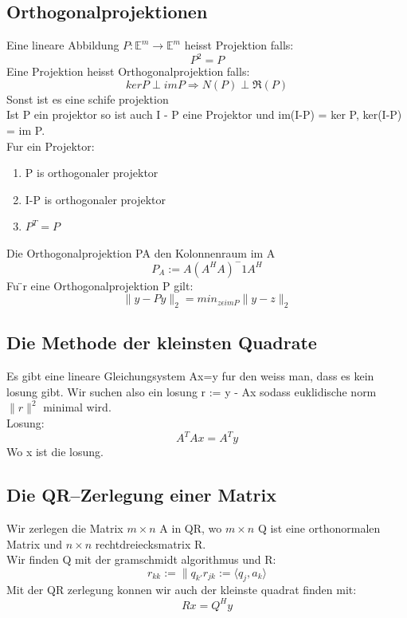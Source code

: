 \documentclass[11pt]{article}
\begin{document}
\subsection{Orthogonalprojektionen}
Eine lineare Abbildung $P: \mathbb{E}^m \rightarrow \mathbb{E}^m$ heisst Projektion falls:
\begin{equation}
	P^2=P
\end{equation}
Eine Projektion heisst Orthogonalprojektion falls:
\begin{equation}
	ker P \perp im P \Rightarrow N(P) \perp \Re (P)
\end{equation}
Sonst ist es eine schife projektion\\
Ist P ein projektor so ist auch I - P eine Projektor und im(I-P) = ker P, ker(I-P) = im P.\\
Fur ein Projektor:
\begin{enumerate}
	\item P is orthogonaler projektor
	\item I-P is orthogonaler projektor
	\item $P^T=P$
\end{enumerate}
Die Orthogonalprojektion PA den Kolonnenraum im A
\begin{equation}
	P_A := A(A^HA)^-1A^H
\end{equation}
Fu ̈r eine Orthogonalprojektion P gilt:
\begin{equation}
	\parallel y-Py\parallel_2 = min_{z\epsilon im P} \parallel y-z\parallel_2
\end{equation}
\subsection{Die Methode der kleinsten Quadrate}
Es gibt eine lineare Gleichungsystem Ax=y fur den weiss man, dass es kein losung gibt. Wir suchen also ein losung r := y - Ax sodass euklidische norm $\parallel r \parallel^2$ minimal wird.\\
Losung:
\begin{equation}
	A^TAx=A^Ty
\end{equation}
Wo x ist die losung.
\subsection{Die QR–Zerlegung einer Matrix}
Wir zerlegen die Matrix $m\times n$ A in QR, wo $m\times n$ Q ist eine orthonormalen Matrix und $n\times n$ rechtdreiecksmatrix R.\\
Wir finden Q mit der gramschmidt algorithmus und R:
\begin{equation}
	r_{kk} := \parallel q_{k'}
	r_{jk} := \langle q_j,a_k \rangle
\end{equation}
Mit der QR zerlegung konnen wir auch der kleinste quadrat finden mit:
\begin{equation}
	Rx = Q^Hy
\end{equation}
\end{document}
